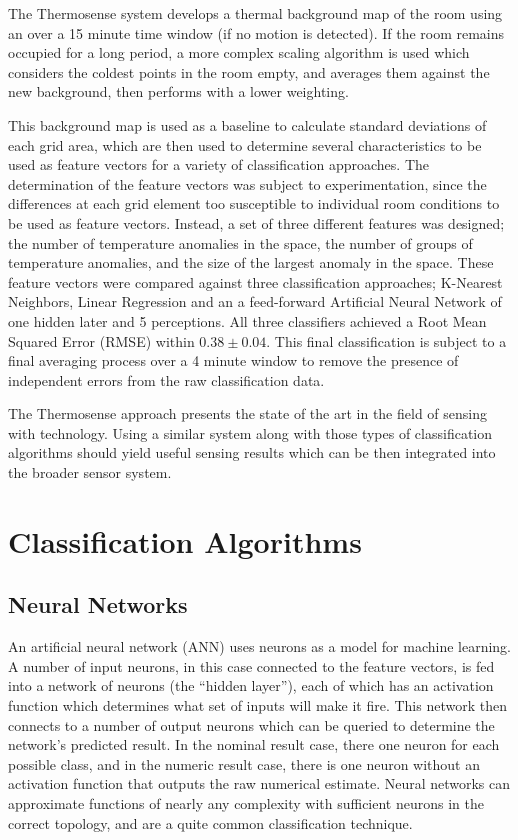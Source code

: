 \documentclass[../thesis/thesis.tex]{subfiles}
\begin{document}
The Thermosense system develops a thermal background map of the room using an \emwa over a 15 minute time window (if no motion is detected). If the room remains occupied for a long period, a more complex scaling algorithm is used which considers the coldest points in the room empty, and averages them against the new background, then performs \emwa with a lower weighting.

This background map is used as a baseline to calculate standard deviations of each grid area, which are then used to determine several characteristics to be used as feature vectors for a variety of classification approaches. The determination of the feature vectors was subject to experimentation, since the differences at each grid element too susceptible to individual room conditions to be used as feature vectors. Instead, a set of three different features was designed; the number of temperature anomalies in the space, the number of groups of temperature anomalies, and the size of the largest anomaly in the space. These feature vectors were compared against three classification approaches; K-Nearest Neighbors, Linear Regression and an a feed-forward Artificial Neural Network of one hidden later and 5 perceptions. All three classifiers achieved a Root Mean Squared Error (RMSE) within $0.38\pm0.04$. This final classification is subject to a final averaging process over a 4 minute window to remove the presence of independent errors from the raw classification data.

The Thermosense approach presents the state of the art in the field of sensing with \iar technology. Using a similar \iar system along with those types of classification algorithms should yield useful sensing results which can be then integrated into the broader sensor system.


\section{Classification Algorithms}
\subsection{Neural Networks}
An artificial neural network (ANN) uses neurons as a model for machine learning. A number of input neurons, in this case connected to the feature vectors, is fed into a network of neurons (the ``hidden layer''), each of which has an activation function which determines what set of inputs will make it fire. This network then connects to a number of output neurons which can be queried to determine the network's predicted result. In the nominal result case, there one neuron for each possible class, and in the numeric result case, there is one neuron without an activation function that outputs the raw numerical estimate. Neural networks can approximate functions of nearly any complexity with sufficient neurons in the correct topology, and are a quite common classification technique.
\end{document}
